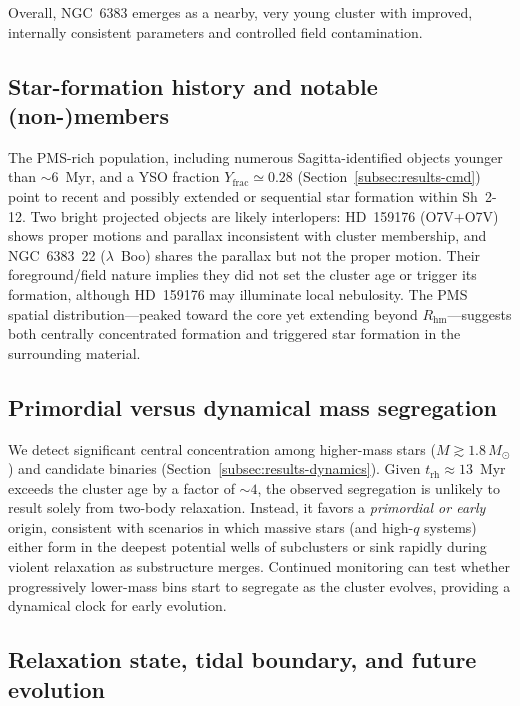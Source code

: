 \documentclass[../main.tex]{subfiles}
\begin{document}
Overall, NGC~6383 emerges as a nearby, very young cluster with improved, internally consistent parameters and controlled field contamination.

\subsection{Star-formation history and notable (non-)members}
\label{subsec:discussion-members}

The PMS-rich population, including numerous Sagitta-identified objects younger than $\sim6$~Myr, and a YSO fraction $Y_{\text{frac}}\simeq0.28$ (Section~\ref{subsec:results-cmd}) point to recent and possibly extended or sequential star formation within Sh~2-12. Two bright projected objects are likely interlopers: HD~159176 (O7V+O7V) shows proper motions and parallax inconsistent with cluster membership, and NGC~6383~22 ($\lambda$~Boo) shares the parallax but not the proper motion. Their foreground/field nature implies they did not set the cluster age or trigger its formation, although HD~159176 may illuminate local nebulosity. The PMS spatial distribution---peaked toward the core yet extending beyond $R_{\text{hm}}$---suggests both centrally concentrated formation and triggered star formation in the surrounding material.

\subsection{Primordial versus dynamical mass segregation}
\label{subsec:discussion-segregation}

We detect significant central concentration among higher-mass stars ($M\gtrsim1.8\,M_\odot$) and candidate binaries (Section~\ref{subsec:results-dynamics}). Given $t_{\text{rh}}\approx13$~Myr exceeds the cluster age by a factor of $\sim4$, the observed segregation is unlikely to result solely from two-body relaxation. Instead, it favors a \emph{primordial or early} origin, consistent with scenarios in which massive stars (and high-$q$ systems) either form in the deepest potential wells of subclusters or sink rapidly during violent relaxation as substructure merges. Continued monitoring can test whether progressively lower-mass bins start to segregate as the cluster evolves, providing a dynamical clock for early evolution.

\subsection{Relaxation state, tidal boundary, and future evolution}
\label{subsec:discussion-future}
\end{document}
